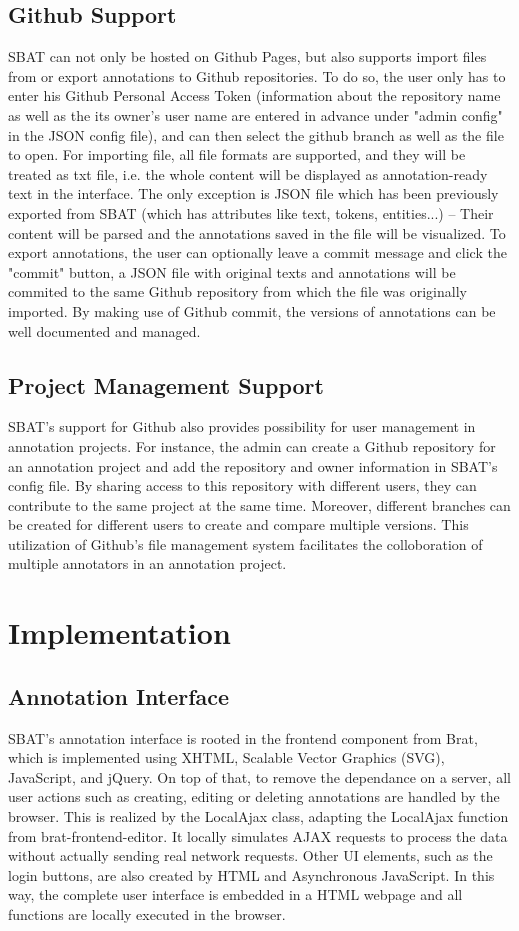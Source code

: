 \documentclass[a4paper]{article}
\begin{document}
\subsection{Github Support}
SBAT can not only be hosted on Github Pages, but also supports import files from or export annotations to Github repositories. To do so, the user only has to enter his Github Personal Access Token (information about the repository name as well as the its owner's user name are entered in advance under "admin config" in the JSON config file), and can then select the github branch as well as the file to open. For importing file, all file formats are supported, and they will be treated as txt file, i.e. the whole content will be displayed as annotation-ready text in the interface. The only exception is JSON file which has been previously exported from SBAT (which has attributes like text, tokens, entities...) -- Their content will be parsed and the annotations saved in the file will be visualized. To export annotations, the user can optionally leave a commit message and click the "commit" button, a JSON file with original texts and annotations will be commited to the same Github repository from which the file was originally imported. By making use of Github commit, the versions of annotations can be well documented and managed.
\subsection{Project Management Support}
SBAT's support for Github also provides possibility for user management in annotation projects. For instance, the admin can create a Github repository for an annotation project and add the repository and owner information in SBAT's config file. By sharing access to this repository with different users, they can contribute to the same project at the same time. Moreover, different branches can be created for different users to create and compare multiple versions. This utilization of Github's file management system facilitates the colloboration of multiple annotators in an annotation project.
\section{Implementation}
\subsection{Annotation Interface}
SBAT's annotation interface is rooted in the frontend component from Brat, which is implemented using XHTML, Scalable Vector Graphics (SVG), JavaScript, and jQuery. On top of that, to remove the dependance on a server, all user actions such as creating, editing or deleting annotations are handled by the browser. This is realized by the LocalAjax class, adapting the LocalAjax function from brat-frontend-editor. It locally simulates AJAX requests to process the data without actually sending real network requests. Other UI elements, such as the login buttons, are also created by HTML and Asynchronous JavaScript. In this way, the complete user interface is embedded in a HTML webpage and all functions are locally executed in the browser.
\end{document}
